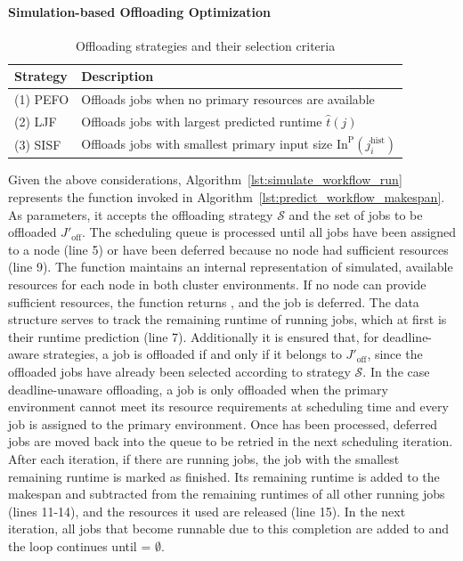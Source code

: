 \paragraph{Simulation-based Offloading Optimization}
\begin{table}[t] 
\caption{Offloading strategies and their selection criteria} 
\centering 
\footnotesize 
\begin{tabular}{l|l} 
\textbf{Strategy} & \textbf{Description} \\ \hline  (1) PEFO & Offloads jobs when no primary resources are available  \\ (2) LJF & Offloads jobs with largest predicted runtime $\hat{t}(j)$ \\ (3) SISF & Offloads jobs with smallest primary input size $\text{In}^\text{P}(j_i^\text{hist})$
\end{tabular} 
\label{tab:offloading-strategies} 
\end{table} 
Given the above considerations, Algorithm~\ref{lst:simulate_workflow_run} represents the  function invoked in Algorithm~\ref{lst:predict_workflow_makespan}.
As parameters, it accepts the offloading strategy $\mathcal{S}$ and the set of jobs to be offloaded $J'_\text{off}$.
The scheduling queue  is processed until all jobs have been assigned to a node (line 5) or have been deferred because no node had sufficient resources (line 9).
The  function maintains an internal representation of simulated, available resources for each node in both cluster environments. If no node can provide sufficient resources, the function returns , and the job is deferred.
The data structure  serves to track the remaining runtime of running jobs, which at first is their runtime prediction (line 7).
Additionally it is ensured that, for deadline-aware strategies, a job is offloaded if and only if it belongs to $J'_\text{off}$, since the offloaded jobs have already been selected according to strategy $\mathcal{S}$. In the case deadline-unaware offloading, a job is only offloaded when the primary environment cannot meet its resource requirements at scheduling time and every job is assigned to the primary environment.
Once  has been processed, deferred jobs are moved back into the queue to be retried in the next scheduling iteration. After each iteration, if there are running jobs, the job with the smallest remaining runtime is marked as finished. Its remaining runtime is added to the makespan and subtracted from the remaining runtimes of all other running jobs (lines 11-14), and the resources it used are released (line 15). In the next iteration, all jobs that become runnable due to this completion are added to  and the loop continues until  = $\emptyset$.

